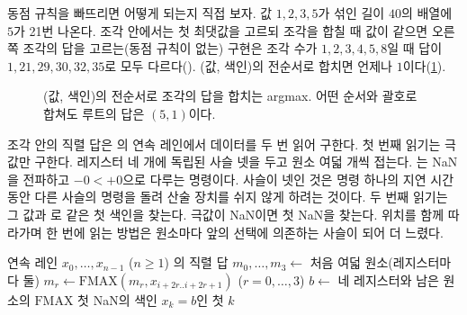 동점 규칙을 빠뜨리면 어떻게 되는지 직접 보자. 값 $1,2,3,5$가 섞인 길이 $40$의 배열에 $5$가 21번 나온다. 조각 안에서는 첫 최댓값을 고르되 조각을 합칠 때 값이 같으면 오른쪽 조각의 답을 고르는(동점 규칙이 없는) 구현은 조각 수가 $1,2,3,4,5,8$일 때 답이 $1,21,29,30,32,35$로 모두 다르다(). (값, 색인)의 전순서로 합치면 언제나 $1$이다(\cref{fig:argmax-tree}).

\begin{figure}[htbp]
\centering
{}
\caption{(값, 색인)의 전순서로 조각의 답을 합치는 argmax. 어떤 순서와 괄호로 합쳐도 루트의 답은 $(5,1)$이다.}
\label{fig:argmax-tree}
\end{figure}


조각 안의 직렬 답은 의 연속 레인에서 데이터를 두 번 읽어 구한다. 첫 번째 읽기는 극값만 구한다. 레지스터 네 개에 독립된  사슬 넷을 두고 원소 여덟 개씩 접는다. 는 NaN을 전파하고 $-0<+0$으로 다루는 명령이다. 사슬이 넷인 것은 명령 하나의 지연 시간 동안 다른 사슬의 명령을 돌려 산술 장치를 쉬지 않게 하려는 것이다. 두 번째 읽기는 그 값과 \code{==}로 같은 첫 색인을 찾는다. 극값이 NaN이면 첫 NaN을 찾는다. 위치를 함께 따라가며 한 번에 읽는 방법은 원소마다 앞의 선택에 의존하는 사슬이 되어 더 느렸다.

\begin{algorithm}[htbp]
\begin{algorithmic}[1]
\Require 연속 레인 $x_0,\dots,x_{n-1}$ ($n\ge1$)
\Ensure {}의 직렬 답
\State $m_0,\dots,m_3\gets$ 처음 여덟 원소(레지스터마다 둘) 
  \State $m_r\gets\mathrm{FMAX}(m_r,x_{i+2r..i+2r+1})$ ($r=0,\dots,3$) 
\EndFor
\State $b\gets$ 네 레지스터와 남은 원소의 $\mathrm{FMAX}$
 \Return 첫 NaN의 색인 \EndIf
\State \Return $x_k=b$인 첫 $k$ 
\end{algorithmic}
\caption{두 번 읽는 argmax 커널 (stardust )}
\label{alg:argmax-kernel}
\end{algorithm}

